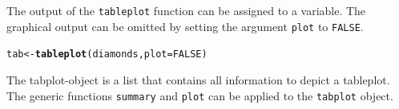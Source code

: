 \documentclass[11pt, fleqn, a4paper]{article}\usepackage{graphicx, color}
\makeatletter
\newcommand{\hlfunctioncall}[1]{\textcolor[rgb]{0.501960784313725,0,0.329411764705882}{\textbf{#1}}}%
\newenvironment{kframe}{%
 \def\at@end@of@kframe{}%
 \ifinner\ifhmode%
  \def\at@end@of@kframe{\end{minipage}}%
  \begin{minipage}{\columnwidth}%
 \fi\fi%
 \def\FrameCommand##1{\hskip\@totalleftmargin \hskip-\fboxsep
 \colorbox{shadecolor}{##1}\hskip-\fboxsep
     \hskip-\linewidth \hskip-\@totalleftmargin \hskip\columnwidth}%
 \MakeFramed {\advance\hsize-\width
   \@totalleftmargin\z@ \linewidth\hsize
   \@setminipage}}%
 {\par\unskip\endMakeFramed%
 \at@end@of@kframe}
\newenvironment{knitrout}{}{} %
\makeatother
\begin{document}
The output of the {\tt tableplot} function can be assigned to a variable. The graphical output can be omitted by setting the argument {\tt plot} to {\tt FALSE}.

\begin{knitrout}
\color{fgcolor}\begin{kframe}
\begin{alltt}
tab <- \hlfunctioncall{tableplot}(diamonds, plot = FALSE)
\end{alltt}
\end{kframe}
\end{knitrout}


The tabplot-object is a list that contains all information to depict a tableplot. The generic functions {\tt summary} and {\tt plot} can be applied to the {\tt tabplot} object.
\end{document}
